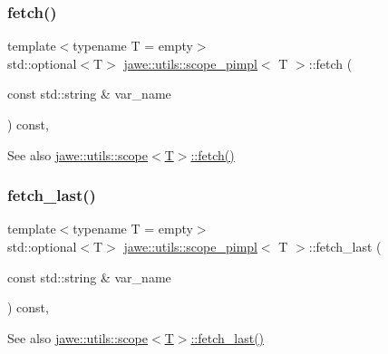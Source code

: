 \subsubsection{\texorpdfstring{fetch()}{fetch()}}
{\footnotesize\ttfamily template$<$typename T = empty$>$ \\
std\+::optional$<$T$>$ \hyperlink{classjawe_1_1utils_1_1scope__pimpl}{jawe\+::utils\+::scope\+\_\+pimpl}$<$ T $>$\+::fetch (\begin{DoxyParamCaption}\item[{const std\+::string \&}]{var\+\_\+name }\end{DoxyParamCaption}) const\hspace{0.3cm}{\ttfamily [inline]}, {\ttfamily [private]}}

\begin{DoxySeeAlso}{See also}
\hyperlink{classjawe_1_1utils_1_1scope_aa0db4d0cbe6a4020ed496cd5cbcd8e6a}{jawe\+::utils\+::scope$<$\+T$>$\+::fetch()} 
\end{DoxySeeAlso}
\mbox{\label{classjawe_1_1utils_1_1scope__pimpl_a839753794d639687f56213cd07eb732c}} 
\subsubsection{\texorpdfstring{fetch\+\_\+last()}{fetch\_last()}}
{\footnotesize\ttfamily template$<$typename T = empty$>$ \\
std\+::optional$<$T$>$ \hyperlink{classjawe_1_1utils_1_1scope__pimpl}{jawe\+::utils\+::scope\+\_\+pimpl}$<$ T $>$\+::fetch\+\_\+last (\begin{DoxyParamCaption}\item[{const std\+::string \&}]{var\+\_\+name }\end{DoxyParamCaption}) const\hspace{0.3cm}{\ttfamily [inline]}, {\ttfamily [private]}}

\begin{DoxySeeAlso}{See also}
\hyperlink{classjawe_1_1utils_1_1scope_a0c78dd9721664a665190297c4a5b06a7}{jawe\+::utils\+::scope$<$\+T$>$\+::fetch\+\_\+last()} 
\end{DoxySeeAlso}
\mbox{\label{classjawe_1_1utils_1_1scope__pimpl_a6c941f1e400500a32d15a577eeabeda1}} 
